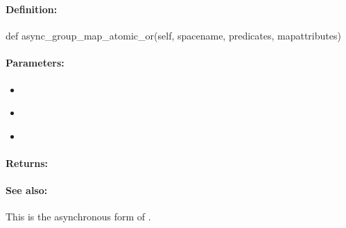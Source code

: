 \subsubsection{}
\label{api:python:async_group_map_atomic_or}


\paragraph{Definition:}
\begin{pythoncode}
def async_group_map_atomic_or(self, spacename, predicates, mapattributes)
\end{pythoncode}

\paragraph{Parameters:}
\begin{itemize}[noitemsep]
\item {}\\

\item {}\\

\item {}\\

\end{itemize}

\paragraph{Returns:}


\paragraph{See also:}  This is the asynchronous form of .

\pagebreak
\subsubsection{}
\label{api:python:map_atomic_xor}


